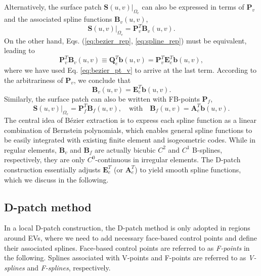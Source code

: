 \documentclass[graybox]{svmult}
\begin{document}
Alternatively, the surface patch $\bm{S}(u,v)|_{\Omega_e}$ can also be expressed in terms of $\bm{P}_v$ and the associated spline functions $\bm{B}_v(u,v)$, %
\begin{equation}
\bm{S}(u,v)|_{\Omega_e} = \bm{P}_v^T \bm{B}_v(u,v).
\label{eq:spline_rep}
\end{equation}
On the other hand, Eqs. (\ref{eq:bezier_rep}, \ref{eq:spline_rep}) must be equivalent, leading to
\begin{equation}
\bm{P}_v^T \bm{B}_v(u,v) \equiv \bm{Q}_e^T \bm{b}(u,v) = \bm{P}_v^T \bm{E}_e^T \bm{b}(u,v),
\end{equation}
where we have used Eq. \eqref{eq:bezier_pt_v} to arrive at the last term.
According to the arbitrariness of $\bm{P}_v$, we conclude that
\begin{equation}
\bm{B}_v(u,v) = \bm{E}_e^T \bm{b}(u,v).
\label{eq:vspline_c0}
\end{equation}
Similarly, the surface patch can also be written with FB-points $\bm{P}_f$,
\begin{equation}
\bm{S}(u,v)|_{\Omega_e} = \bm{P}_f^T \bm{B}_f(u,v), \quad \text{with}\quad \bm{B}_f(u,v) = \bm{A}_e^T \bm{b}(u,v).
\label{eq:fspline_c0}
\end{equation}
The central idea of B\'{e}zier extraction is to express each spline function as a linear combination of Bernstein polynomials, which enables general spline functions to be easily integrated with existing finite element and isogeometric codes. While in regular elements, $\bm{B}_v$ and $\bm{B}_f$ are actually bicubic $C^2$ and $C^1$ B-splines, respectively, they are only $C^0$-continuous in irregular elements. The D-patch construction essentially adjusts $\bm{E}_e^T$ (or $\bm{A}_e^T$) to yield smooth spline functions, which we discuss in the following.

\subsection{D-patch method}
\label{subsec:dpatch}

In a local D-patch construction, the D-patch method is only adopted in regions around EVs, where we need to add necessary face-based control points and define their associated splines. Face-based control points are referred to as \emph{F-points} in the following. Splines associated with V-points and F-points are referred to as \emph{V-splines} and \emph{F-splines}, respectively.
\end{document}
